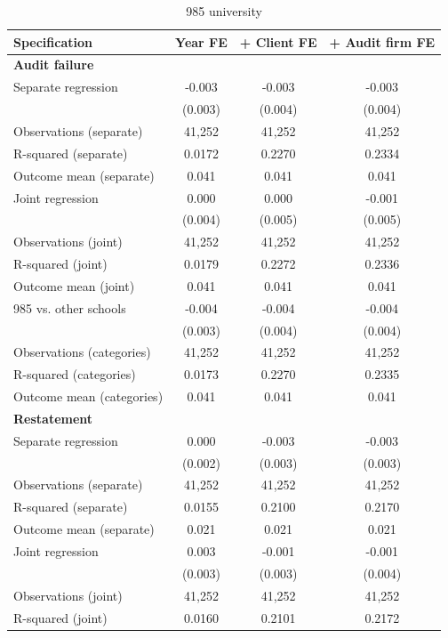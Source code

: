 \begin{table}[htbp]
\footnotesize
\centering
\caption{985 university}
\begin{threeparttable}
\begin{tabular}{p{}ccc}
\toprule
Specification & Year FE & + Client FE & + Audit firm FE \\
\midrule
\multicolumn{4}{l}{\textbf{Audit failure}} \\
Separate regression & -0.003 & -0.003 & -0.003 \\
 & (0.003) & (0.004) & (0.004) \\
Observations (separate) & 41,252 & 41,252 & 41,252 \\
R-squared (separate) & 0.0172 & 0.2270 & 0.2334 \\
Outcome mean (separate) & 0.041 & 0.041 & 0.041 \\
Joint regression & 0.000 & 0.000 & -0.001 \\
 & (0.004) & (0.005) & (0.005) \\
Observations (joint) & 41,252 & 41,252 & 41,252 \\
R-squared (joint) & 0.0179 & 0.2272 & 0.2336 \\
Outcome mean (joint) & 0.041 & 0.041 & 0.041 \\
985 vs. other schools & -0.004 & -0.004 & -0.004 \\
 & (0.003) & (0.004) & (0.004) \\
Observations (categories) & 41,252 & 41,252 & 41,252 \\
R-squared (categories) & 0.0173 & 0.2270 & 0.2335 \\
Outcome mean (categories) & 0.041 & 0.041 & 0.041 \\
\multicolumn{4}{l}{\textbf{Restatement}} \\
Separate regression & 0.000 & -0.003 & -0.003 \\
 & (0.002) & (0.003) & (0.003) \\
Observations (separate) & 41,252 & 41,252 & 41,252 \\
R-squared (separate) & 0.0155 & 0.2100 & 0.2170 \\
Outcome mean (separate) & 0.021 & 0.021 & 0.021 \\
Joint regression & 0.003 & -0.001 & -0.001 \\
 & (0.003) & (0.003) & (0.004) \\
Observations (joint) & 41,252 & 41,252 & 41,252 \\
R-squared (joint) & 0.0160 & 0.2101 & 0.2172 \\

\end{tabular}
\end{threeparttable}
\end{table}
